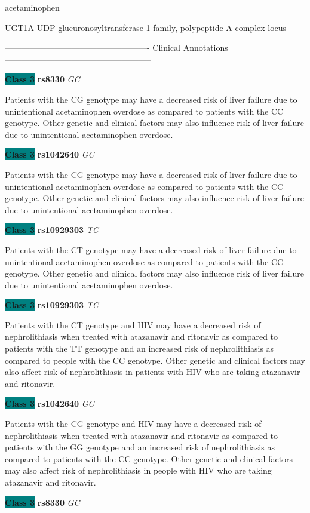 \documentclass{resume} %
\begin{document}
\begin{rSection}{ acetaminophen }
\begin{rSubsection}{ UGT1A }{ UDP glucuronosyltransferase 1 family, polypeptide A complex locus }{}{}
\item[]

\item[] ---------------------------------------------------- Clinical Annotations -----------------------------------------------------\newline
\item \textbf{\colorbox{teal} {Class 3}} \textbf{ rs8330 } \textit{ GC }
\item[] Patients with the CG genotype may have a decreased risk of liver failure due to unintentional acetaminophen overdose as compared to patients with the CC genotype. Other genetic and clinical factors may also influence risk of liver failure due to unintentional acetaminophen overdose.\item \textbf{\colorbox{teal} {Class 3}} \textbf{ rs1042640 } \textit{ GC }
\item[] Patients with the CG genotype may have a decreased risk of liver failure due to unintentional acetaminophen overdose as compared to patients with the CC genotype. Other genetic and clinical factors may also influence risk of liver failure due to unintentional acetaminophen overdose.\item \textbf{\colorbox{teal} {Class 3}} \textbf{ rs10929303 } \textit{ TC }
\item[] Patients with the CT genotype may have a decreased risk of liver failure due to unintentional acetaminophen overdose as compared to patients with the CC genotype. Other genetic and clinical factors may also influence risk of liver failure due to unintentional acetaminophen overdose.\item \textbf{\colorbox{teal} {Class 3}} \textbf{ rs10929303 } \textit{ TC }
\item[] Patients with the CT genotype and HIV may have a decreased risk of nephrolithiasis when treated with atazanavir and ritonavir as compared to patients with the TT genotype and an increased risk of nephrolithiasis as compared to people with the CC genotype. Other genetic and clinical factors may also affect risk of nephrolithiasis in patients with HIV who are taking atazanavir and ritonavir. \item \textbf{\colorbox{teal} {Class 3}} \textbf{ rs1042640 } \textit{ GC }
\item[] Patients with the CG genotype and HIV may have a decreased risk of nephrolithiasis when treated with atazanavir and ritonavir as compared to patients with the GG genotype and an increased risk of nephrolithiasis as compared to patients with the CC genotype. Other genetic and clinical factors may also affect risk of nephrolithiasis in people with HIV who are taking atazanavir and ritonavir.\item \textbf{\colorbox{teal} {Class 3}} \textbf{ rs8330 } \textit{ GC }

\end{rSubsection}
\end{rSection}
\end{document}
